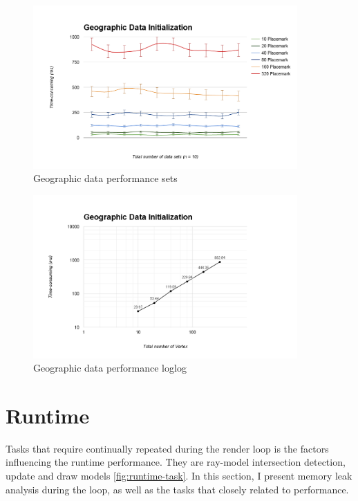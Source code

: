 \begin{figure}[H]
	\caption{Geographic data performance sets}
	\label{fig:geographic-data-performance-sets}
	\centering
	\includegraphics[width=0.9\textwidth, keepaspectratio]{Figures/geographic-data-performance-sets.png}
	\decoRule
\end{figure}

\begin{figure}[H]
	\caption{Geographic data performance loglog}
	\label{fig:geographic-data-performance-loglog}
	\centering
	\includegraphics[width=0.9\textwidth, keepaspectratio]{Figures/geographic-data-performance-loglog.png}
	\decoRule
\end{figure}

\section{Runtime}

Tasks that require continually repeated during the render loop is the factors influencing the runtime performance. They are ray-model intersection detection, update and draw models \ref{fig:runtime-task}. In this section, I present memory leak analysis during the loop, as well as the tasks that closely related to performance.
 

